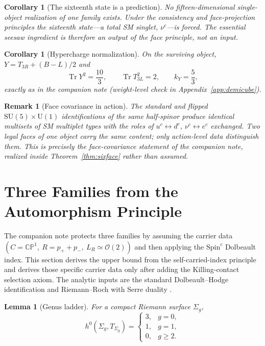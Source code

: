 \documentclass[
  aps,
  prd,
  preprint,
  nofootinbib,
  superscriptaddress,
  longbibliography
]{revtex4-2}
\newcommand{\Spin}{\mathrm{Spin}}
\newcommand{\SU}{\mathrm{SU}}
\newcommand{\U}{\mathrm{U}}
\newcommand{\CP}{\mathbb{CP}}
\newcommand{\cO}{\mathcal{O}}
\DeclareMathOperator{\Tr}{Tr}
\newtheorem{lemma}[theorem]{Lemma}
\newtheorem{corollary}[theorem]{Corollary}
\newtheorem{remark}[theorem]{Remark}
\begin{document}
\begin{corollary}[The sixteenth state is a prediction]
\label{cor:nuc}
No fifteen-dimensional single-object realization of one family exists.
Under the consistency and face-projection principles the sixteenth
state---a total SM singlet, \(\nu^c\)---is forced.  The essential seesaw
ingredient is therefore an output of the face principle, not an input.
\end{corollary}

\begin{corollary}[Hypercharge normalization]
\label{cor:ky}
On the surviving object, \(Y=T_{3R}+(B-L)/2\) and
\[
  \Tr Y^2=\frac{10}{3},\qquad \Tr T_{3L}^2=2,\qquad
  k_Y=\frac53 ,
\]
exactly as in the companion note (weight-level check in
Appendix~\ref{app:demicube}).
\end{corollary}

\begin{remark}[Face covariance in action]
The standard and flipped \(\SU(5)\times\U(1)\) identifications of the same
half-spinor produce identical multisets of SM multiplet types with the
roles of \(u^c\leftrightarrow d^c\), \(\nu^c\leftrightarrow e^c\)
exchanged.  Two legal faces of one object carry the same content; only
action-level data distinguish them.  This is precisely the face-covariance
statement of the companion note, realized inside
Theorem~\ref{thm:sixface} rather than assumed.
\end{remark}

\section{Three Families from the Automorphism Principle}
\label{sec:families}

The companion note protects three families by assuming the carrier data
\((C=\CP^1,\ R=p_++p_-,\ L_R\simeq\cO(2))\) and then applying the
\(\Spin^c\) Dolbeault index.  This section derives the upper bound from the
self-carried-index principle and derives those specific carrier data only
after adding the Killing-contact selection axiom.  The analytic inputs are
the standard Dolbeault--Hodge identification and Riemann--Roch with Serre
duality \cite{LawsonMichelsohn1989,GriffithsHarris1978}.

\begin{lemma}[Genus ladder]
\label{lem:ladder}
For a compact Riemann surface \(\Sigma_g\),
\[
  h^0(\Sigma_g,T_{\Sigma_g})
  =\begin{cases}
    3, & g=0,\\
    1, & g=1,\\
    0, & g\ge2 .
  \end{cases}
\]
\end{lemma}
\end{document}
